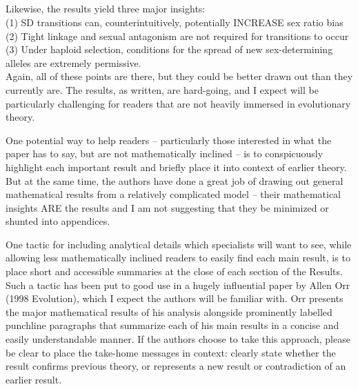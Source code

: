 \documentclass[10pt,letterpaper]{article}
\begin{document}
\noindent\subsection{}
Likewise, the results yield three major insights:\\
(1) SD transitions can, counterintuitively, potentially INCREASE sex ratio bias\\
(2) Tight linkage and sexual antagonism are not required for transitions to occur\\
(3) Under haploid selection, conditions for the spread of new sex-determining alleles are extremely permissive.\\
Again, all of these points are there, but they could be better drawn out than they currently are. The results, as written, are hard-going, and I expect will be particularly challenging for readers that are not heavily immersed in evolutionary theory.

One potential way to help readers -- particularly those interested in what the paper has to say, but are not mathematically inclined -- is to conspicuously highlight each important result and briefly place it into context of earlier theory. But at the same time, the authors have done a great job of drawing out general mathematical results from a relatively complicated model -- their mathematical insights ARE the results and I am not suggesting that they be minimized or shunted into appendices.

One tactic for including analytical details which specialists will want to see, while allowing less mathematically inclined readers to easily find each main result, is to place short and accessible summaries at the close of each section of the Results. Such a tactic has been put to good use in a hugely influential paper by Allen Orr (1998 Evolution), which I expect the authors will be familiar with. Orr presents the major mathematical results of his analysis alongside prominently labelled punchline paragraphs that summarize each of his main results in a concise and easily understandable manner. If the authors choose to take this approach, please be clear to place the take-home messages in context: clearly state whether the result confirms previous theory, or represents a new result or contradiction of an earlier result.
\end{document}
